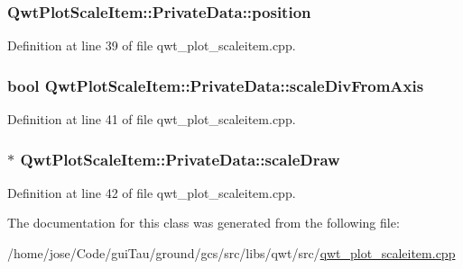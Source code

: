 \hypertarget{class_qwt_plot_scale_item_1_1_private_data_afeba5668df556eab629a60a952eb2260}{
\subsubsection[{position}]{ Qwt\-Plot\-Scale\-Item\-::\-Private\-Data\-::position}}\label{class_qwt_plot_scale_item_1_1_private_data_afeba5668df556eab629a60a952eb2260}


Definition at line 39 of file qwt\-\_\-plot\-\_\-scaleitem.\-cpp.

\hypertarget{class_qwt_plot_scale_item_1_1_private_data_a71f14280805cc6401ddb0e5372781e0a}{
\subsubsection[{scale\-Div\-From\-Axis}]{\setlength{\rightskip}{0pt plus 5cm}bool Qwt\-Plot\-Scale\-Item\-::\-Private\-Data\-::scale\-Div\-From\-Axis}}\label{class_qwt_plot_scale_item_1_1_private_data_a71f14280805cc6401ddb0e5372781e0a}


Definition at line 41 of file qwt\-\_\-plot\-\_\-scaleitem.\-cpp.

\hypertarget{class_qwt_plot_scale_item_1_1_private_data_a79db4c7b2397d1f713d4cf331d06a53b}{
\subsubsection[{scale\-Draw}]{$\ast$ Qwt\-Plot\-Scale\-Item\-::\-Private\-Data\-::scale\-Draw}}\label{class_qwt_plot_scale_item_1_1_private_data_a79db4c7b2397d1f713d4cf331d06a53b}


Definition at line 42 of file qwt\-\_\-plot\-\_\-scaleitem.\-cpp.



The documentation for this class was generated from the following file\-:\begin{DoxyCompactItemize}
\item 
/home/jose/\-Code/gui\-Tau/ground/gcs/src/libs/qwt/src/\hyperlink{qwt__plot__scaleitem_8cpp}{qwt\-\_\-plot\-\_\-scaleitem.\-cpp}\end{DoxyCompactItemize}
